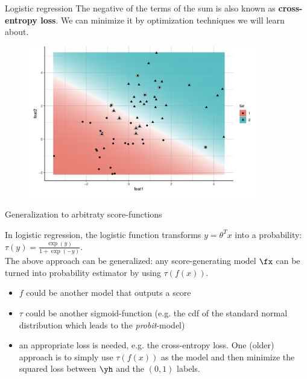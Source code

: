 \begin{vbframe}{Logistic regression}
\vspace{-0.3cm}
The negative of the terms of the sum  is also known as \textbf{cross-entropy loss}.
We can minimize it by optimization techniques we will learn about.

\framebreak

\begin{figure}
  \centering
  \includegraphics[width=10cm]{plots/LR.png}
\end{figure}

\end{vbframe}


\begin{vbframe}{Generalization to arbitraty score-functions}

In logistic regression, the logistic function transforms 
$y = \theta^Tx$ into a probability:
$\tau(y) = \frac{\exp(y)}{1 + \exp(-y)}$.\\
\lz
The above approach can be generalized: any score-generating model $\fx$ can be turned into probability estimator by using $\tau(f(x))$.

\begin{itemize}
\item $f$ could be another model that outputs a score
\item $\tau$ could be another sigmoid-function (e.g. the cdf of the standard normal distribution which leads to the \emph{probit}-model)
\item an appropriate loss is needed, e.g.
the cross-entropy loss.
One (older) approach is to simply use $\tau(f(x))$ as the model and then minimize the squared loss between $\yh$ and the $(0,1)$ labels.
\end{itemize}
\end{vbframe}

